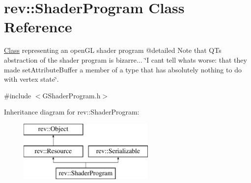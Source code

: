 \hypertarget{classrev_1_1_shader_program}{}\section{rev\+::Shader\+Program Class Reference}
\label{classrev_1_1_shader_program}


\mbox{\hyperlink{struct_class}{Class}} representing an open\+GL shader program @detailed Note that QT\textquotesingle{}s abstraction of the shader program is bizarre... \char`\"{}\+I can\textquotesingle{}t tell what\textquotesingle{}s worse\+: 
that they made set\+Attribute\+Buffer a member of a type that has absolutely nothing to do with vertex state\char`\"{}.  




{\ttfamily \#include $<$G\+Shader\+Program.\+h$>$}

Inheritance diagram for rev\+::Shader\+Program\+:\begin{figure}[H]
\begin{center}
\leavevmode
\includegraphics[height=3.000000cm]{classrev_1_1_shader_program}
\end{center}
\end{figure}
